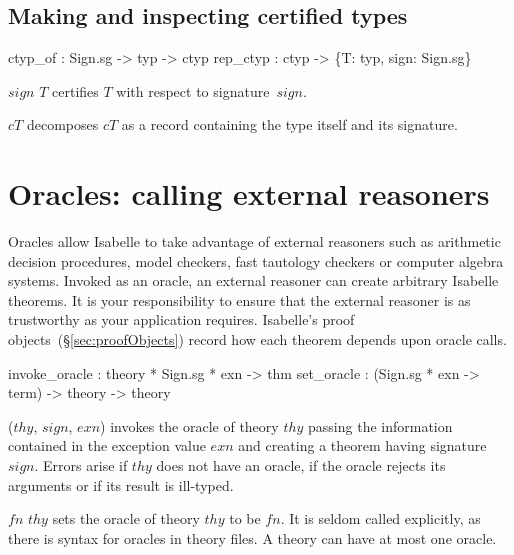 \subsection{Making and inspecting certified types}
\begin{ttbox}
ctyp_of  : Sign.sg -> typ -> ctyp
rep_ctyp : ctyp -> \{T: typ, sign: Sign.sg\}
\end{ttbox}
\begin{ttdescription}
\item[\ttindexbold{ctyp_of} $sign$ $T$] 
certifies $T$ with respect to signature~$sign$.

\item[\ttindexbold{rep_ctyp} $cT$]
decomposes $cT$ as a record containing the type itself and its signature.
\end{ttdescription}


\section{Oracles: calling external reasoners }
\label{sec:oracles}

Oracles allow Isabelle to take advantage of external reasoners such as
arithmetic decision procedures, model checkers, fast tautology checkers or
computer algebra systems.  Invoked as an oracle, an external reasoner can
create arbitrary Isabelle theorems.  It is your responsibility to ensure that
the external reasoner is as trustworthy as your application requires.
Isabelle's proof objects~(\S\ref{sec:proofObjects}) record how each theorem
depends upon oracle calls.

\begin{ttbox}
     invoke_oracle : theory * Sign.sg * exn -> thm
     set_oracle    : (Sign.sg * exn -> term) -> theory -> theory
\end{ttbox}
\begin{ttdescription}
\item[\ttindexbold{invoke_oracle} ($thy$, $sign$, $exn$)] invokes the oracle
  of theory $thy$ passing the information contained in the exception value
  $exn$ and creating a theorem having signature $sign$.  Errors arise if $thy$
  does not have an oracle, if the oracle rejects its arguments or if its
  result is ill-typed.

\item[\ttindexbold{set_oracle} $fn$ $thy$] sets the oracle of theory $thy$ to
  be $fn$.  It is seldom called explicitly, as there is syntax for oracles in
  theory files.  A theory can have at most one oracle.
\end{ttdescription}

